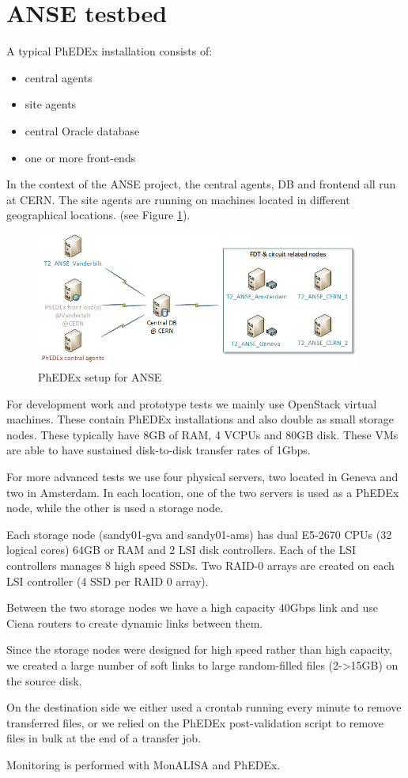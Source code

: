 \section{ANSE testbed}

A typical PhEDEx installation consists of:
\begin{itemize}
	\item central agents
	\item site agents
	\item central Oracle database
	\item one or more front-ends \\
\end{itemize}

In the context of the ANSE project, the central agents, DB and frontend all run
at CERN. The site agents are running on machines located in different geographical
locations. (see Figure \ref{fig:ANSE-setup}).

\begin{figure}[h]
  \centering
  \includegraphics[width=0.95\textwidth]{Figures/ANSE-setup.png}
  \caption{PhEDEx setup for ANSE}
  \label{fig:ANSE-setup}
\end{figure}

For development work and prototype tests we mainly use OpenStack virtual machines.
These contain PhEDEx installations and also double as small storage nodes. These
typically have 8GB of RAM, 4 VCPUs and 80GB disk. These VMs are able to have
sustained disk-to-disk transfer rates of 1Gbps.

For more advanced tests we use four physical servers, two located in Geneva and 
two in Amsterdam. In each location, one of the two servers is used as a PhEDEx node, 
while the other is used a storage node.

Each storage node (sandy01-gva and sandy01-ams) has dual E5-2670 CPUs (32 logical cores)
64GB or RAM and 2 LSI disk controllers. Each of the LSI controllers manages
8 high speed SSDs. Two RAID-0 arrays are created on each LSI controller (4 SSD per
RAID 0 array).

Between the two storage nodes we have a high capacity 40Gbps link and use Ciena
routers to create dynamic links between them.

Since the storage nodes were designed for high speed rather than high capacity,
we created a large number of soft links to large random-filled files (2->15GB) 
on the source disk. 

On the destination side we either used a crontab running every minute to remove
transferred files, or we relied on the PhEDEx post-validation  script to remove 
files in bulk at the end of a transfer job.

Monitoring is performed with MonALISA\cite{MonALISA} and PhEDEx.
